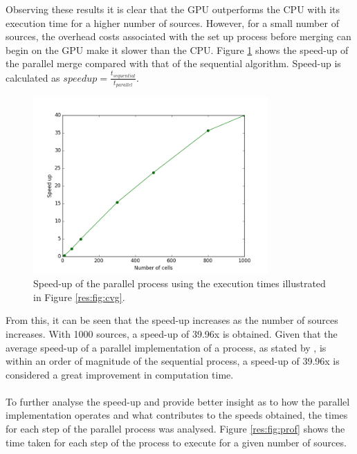 Observing these results it is clear that the GPU outperforms the CPU with its execution time for a higher number of sources. However, for a small number of sources, the overhead costs associated with the set up process before merging can begin on the GPU make it slower than the CPU. Figure \ref{res:fig:speed} shows the speed-up of the parallel merge compared with that of the sequential algorithm. Speed-up is calculated as $speedup = \frac{t_{sequential}}{t_{parallel}}$.
\begin{figure}[H]
\centering
\includegraphics[width=0.8\textwidth]{Images/result_speed.png}
\caption{Speed-up of the parallel process using the execution times illustrated in Figure \ref{res:fig:cvg}.}
\label{res:fig:speed}
\end{figure}
From this, it can be seen that the speed-up increases as the number of sources increases. With 1000 sources, a speed-up of 39.96x is obtained. Given that the average speed-up of a parallel implementation of a process, as stated by \citet{lee2010debunking}, is within an order of magnitude of the sequential process, a speed-up of 39.96x is considered a great improvement in computation time. 
\\
\\
To further analyse the speed-up and provide better insight as to how the parallel implementation operates and what contributes to the speeds obtained, the times for each step of the parallel process was analysed. Figure \ref{res:fig:prof} shows the time taken for each step of the process to execute for a given number of sources.
